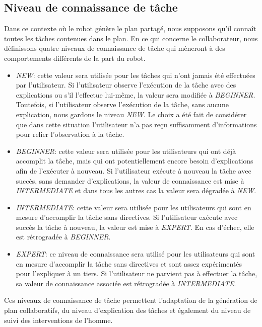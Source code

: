 \documentclass[a4paper,11pt,twoside]{StyleThese}
\begin{document}
\subsection{Niveau de connaissance de tâche}

Dans ce contexte où le robot génère le plan partagé, nous supposons qu'il connaît toutes les tâches contenues dans le plan.
En ce qui concerne le collaborateur, nous définissons quatre niveaux de connaissance de tâche qui mèneront à des comportements différents de la part du robot.

\begin{itemize}
\item \textit{NEW}: cette valeur sera utilisée pour les tâches qui n'ont jamais été effectuées par l'utilisateur. Si l'utilisateur observe l'exécution de la tâche avec des explications ou s'il l'effectue lui-même, la valeur sera modifiée à \textit{BEGINNER}.
Toutefois, si l'utilisateur observe l'exécution de la tâche, sans aucune explication, nous gardons le niveau \textit{NEW}. Le choix a été fait de considérer que dans cette situation l'utilisateur n'a pas reçu suffisamment d'informations pour relier l'observation à la tâche.
\item \textit{BEGINNER}: cette valeur sera utilisée pour les utilisateurs qui ont déjà accomplit la tâche, mais qui ont potentiellement encore besoin d'explications afin de l'exécuter à nouveau. Si l'utilisateur exécute à nouveau la tâche avec succès, sans demander d'explications, la valeur de connaissance est mise à \textit{INTERMEDIATE} et dans tous les autres cas la valeur sera dégradée à \textit{NEW}.
\item \textit{INTERMEDIATE}: cette valeur sera utilisée pour les utilisateurs qui sont en mesure d'accomplir la tâche sans directives. Si l'utilisateur exécute avec succès la tâche à nouveau, la valeur est mise à \textit{EXPERT}. En cas d'échec, elle est rétrogradée à \textit{BEGINNER}.
\item \textit{EXPERT}: ce niveau de connaissance sera utilisé pour les utilisateurs qui sont en mesure d'accomplir la tâche sans directives et sont assez expérimentés pour l'expliquer à un tiers. Si l'utilisateur ne parvient pas à effectuer la tâche, sa valeur de connaissance associée est rétrogradée à \textit{INTERMEDIATE}.
\end{itemize}

Ces niveaux de connaissance de tâche permettent l'adaptation de la génération de plan collaboratifs, du niveau d'explication des tâches et également du niveau de suivi des interventions de l'homme.
\end{document}
